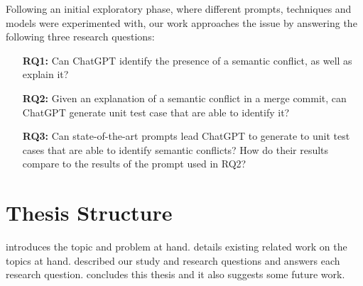 Following an initial exploratory phase, where different prompts, techniques and models were experimented with, our work approaches the issue by answering
the following three research questions:

\begin{itemize}
    \item[\textbf{RQ1:}] Can ChatGPT identify the presence of a semantic conflict, as well as explain it? \\
  
    \item[\textbf{RQ2:}] Given an explanation of a semantic conflict in a merge
    commit, can ChatGPT generate unit test case that are able to identify it? \\
  
    \item[\textbf{RQ3:}] Can state-of-the-art prompts lead ChatGPT to generate to
    unit test cases that are able to identify semantic conflicts?  How do their
    results compare to the results of the prompt used in RQ2? \\
  \end{itemize}

\section{Thesis Structure} \label{sec:struct}


 introduces the topic and problem at hand.
 details existing related work on the topics at hand.
 described our study and research questions and  answers each research question.
 concludes this thesis and it also suggests some future work.
